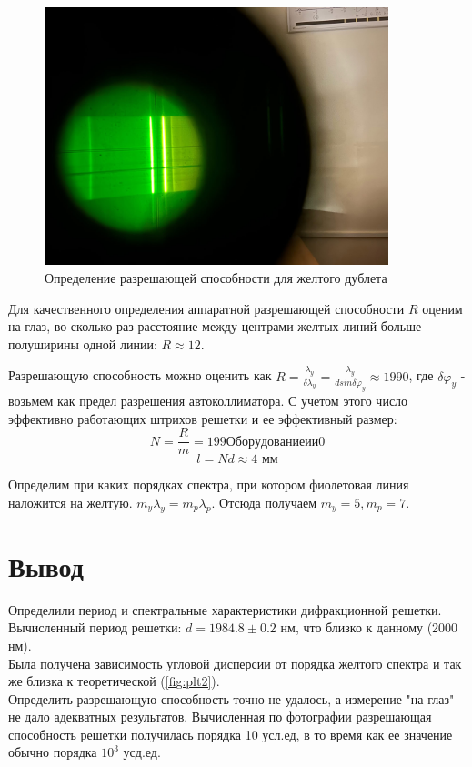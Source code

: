 \begin{figure}[h!]
    \centering
    \includegraphics[width=10cm]{images/getR.jpg}
    \caption{Определение разрешающей способности для желтого дублета}
\end{figure}

Для качественного определения аппаратной разрешающей способности $R$ оценим на глаз, во сколько раз расстояние между центрами желтых линий больше полуширины одной линии: $R \approx 12$.

Разрешающую способность можно оценить как $R = \frac{\lambda_y}{\delta \lambda_y} = \frac{\lambda_y}{d sin\delta\varphi_y} \approx  1990$, где $\delta \varphi_y$ - возьмем как предел разрешения автоколлиматора.
С учетом этого число эффективно работающих штрихов решетки и ее эффективный размер:
\begin{equation}
    N = \frac{R}{m} = 199Оборудование и и0
\end{equation}
\begin{equation}
    l = N d \approx 4 \text{ мм}
\end{equation}

\indent
Определим при каких порядках спектра, при котором фиолетовая линия наложится на желтую. $m_y\lambda_y = m_p\lambda_p$. Отсюда получаем $m_y = 5, m_p = 7$.

\section*{Вывод}

\indent Определили период и спектральные характеристики дифракционной решетки. Вычисленный период решетки: $d = 1984.8 \pm 0.2$ нм, что близко к данному (2000 нм). \\
\indent Была получена зависимость угловой дисперсии от порядка желтого спектра и так же близка к теоретической (\ref{fig:plt2}). \\\indent Определить разрешающую способность точно не удалось, а измерение "на глаз" не дало адекватных результатов. Вычисленная по фотографии разрешающая способность решетки получилась порядка 10 усл.ед, в то время как ее значение обычно порядка $10^3$ усд.ед.\\\indent














